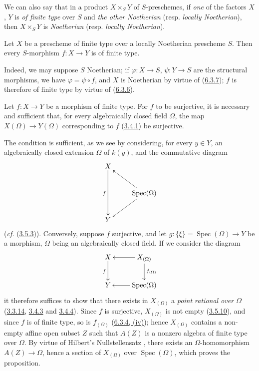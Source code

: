We can also say that in a product $X\times_S Y$ of $S$-preschemes, if
\emph{one} of the
factors $X$, $Y$ is \emph{of finite type} over $S$ and
\emph{the other Noetherian} (resp. \emph{locally Noetherian}), then
$X\times_S Y$ is \emph{Noetherian} (resp. \emph{locally Noetherian}).

\begin{corollary}[6.3.9]
\label{I.6.3.9}
Let $X$ be a prescheme of finite type over a locally Noetherian prescheme
$S$. Then every $S$-morphism $f:X\to Y$ is of finite type.
\end{corollary}

Indeed, we may suppose $S$ Noetherian; if $\varphi:X\to S$,
$\psi:Y\to S$ are the structural morphisms, we have $\varphi=\psi\circ f$, and
$X$ is Noetherian by virtue of (\hyperref[I.6.3.7]{6.3.7}); $f$ is
therefore of finite type by virtue of (\hyperref[I.6.3.6]{6.3.6}).

\begin{proposition}[6.3.10]
\label{I.6.3.10}
Let $f:X\to Y$ be a morphism of finite type. For $f$ to be surjective, it is
necessary and sufficient that, for every algebraically closed field $\Omega$,
the map $X(\Omega)\to Y(\Omega)$ corresponding to $f$
(\hyperref[I.3.4.1]{3.4.1}) be surjective.
\end{proposition}

The condition is sufficient, as we see by considering, for every
$y\in Y$, an algebraically closed extension $\Omega$ of $k(y)$, and the
commutative diagram
\[
  \xymatrix{
    X\ar[dd]_f\\
    & \operatorname{Spec}(\Omega)\ar[ul]\ar[dl]\\
    Y
  }
\]
(\emph{cf.} (\hyperref[I.3.5.3]{3.5.3})). Conversely, suppose $f$
surjective, and let $g:\{\xi\}=\operatorname{Spec}(\Omega)\to Y$ be a
morphism, $\Omega$ being an algebraically closed field. If we consider the
diagram
\[
  \xymatrix{
    X\ar[d]_f &
    X_{(\Omega)}\ar[l]\ar[d]^{f_{(\Omega)}}\\
    Y &
    \operatorname{Spec}(\Omega)\ar[l]
  }
\]
it therefore suffices to show that there exists in $X_{(\Omega)}$ a
\emph{point rational over $\Omega$}
(\hyperref[I.3.3.14]{3.3.14}, \hyperref[I.3.4.3]{3.4.3} and
\hyperref[I.3.4.4]{3.4.4}). Since $f$ is surjective, $X_{(\Omega)}$ is
not empty (\hyperref[I.3.5.10]{3.5.10}), and since $f$ is of finite type,
so is $f_{(\Omega)}$ (\hyperref[I.6.3.4]{6.3.4, (iv)}); hence
$X_{(\Omega)}$ contains a non-empty affine open subset $Z$ such that $A(Z)$ is
a nonzero algebra of finite type over $\Omega$. By virtue of Hilbert's
Nullstellensatz \cite{I-21}, there exists an $\Omega$-homomorphism
$A(Z)\to\Omega$, hence a section of $X_{(\Omega)}$ over
$\operatorname{Spec}(\Omega)$, which proves the proposition.

